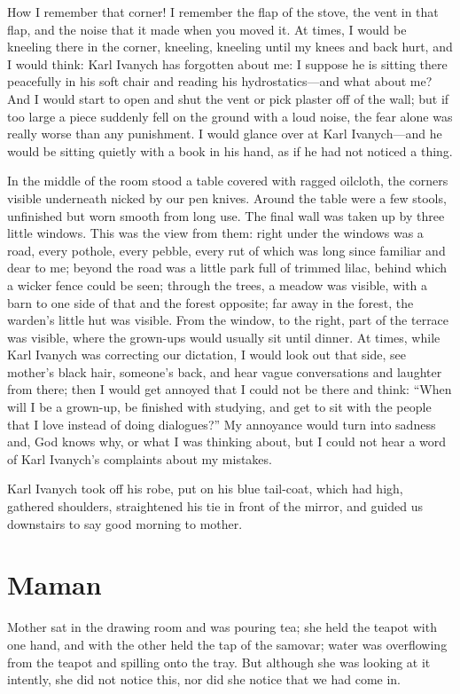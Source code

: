 How I remember that corner! I remember the flap of the stove, the vent in that flap, and the noise that it made when you moved it. At times, I would be kneeling there in the corner, kneeling, kneeling until my knees and back hurt, and I would think: Karl Ivanych has forgotten about me: I suppose he is sitting there peacefully in his soft chair and reading his hydrostatics---and what about me? And I would start to open and shut the vent or pick plaster off of the wall; but if too large a piece suddenly fell on the ground with a loud noise, the fear alone was really worse than any punishment. I would glance over at Karl Ivanych---and he would be sitting quietly with a book in his hand, as if he had not noticed a thing.

In the middle of the room stood a table covered with ragged oilcloth, the corners visible underneath nicked by our pen knives. Around the table were a few stools, unfinished but worn smooth from long use. The final wall was taken up by three little windows. This was the view from them: right under the windows was a road, every pothole, every pebble, every rut of which was long since familiar and dear to me; beyond the road was a little park full of trimmed lilac, behind which a wicker fence could be seen; through the trees, a meadow was visible, with a barn to one side of that and the forest opposite; far away in the forest, the warden's little hut was visible. From the window, to the right, part of the terrace was visible, where the grown-ups would usually sit until dinner. At times, while Karl Ivanych was correcting our dictation, I would look out that side, see mother's black hair, someone's back, and hear vague conversations and laughter from there; then I would get annoyed that I could not be there and think: ``When will I be a grown-up, be finished with studying, and get to sit with the people that I love instead of doing dialogues?'' My annoyance would turn into sadness and, God knows why, or what I was thinking about, but I could not hear a word of Karl Ivanych's complaints about my mistakes. %

Karl Ivanych took off his robe, put on his blue tail-coat, which had high, gathered shoulders, straightened his tie in front of the mirror, and guided us downstairs to say good morning to mother.

\chapter{Maman} %

Mother sat in the drawing room and was pouring tea; she held the teapot with one hand, and with the other held the tap of the samovar; water was overflowing from the teapot and spilling onto the tray. But although she was looking at it intently, she did not notice this, nor did she notice that we had come in.

